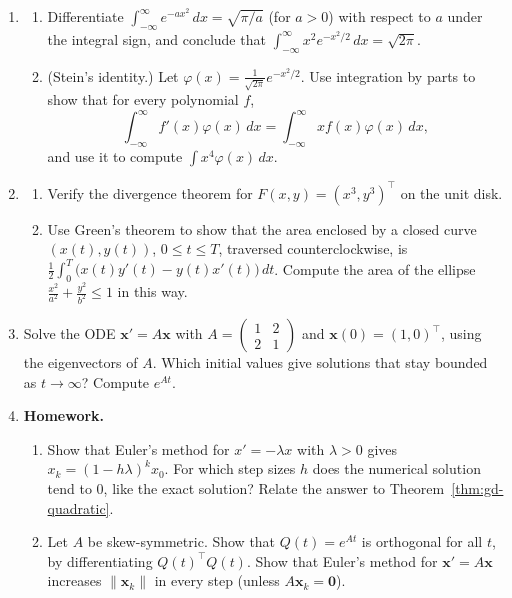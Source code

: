 \documentclass[11pt]{article}
\newcommand{\homework}{\textcolor{red!70!black}{\textbf{Homework.}}}
\newcommand{\norm}[1]{\lVert #1 \rVert}
\theoremstyle{definition}
\theoremstyle{plain}
\theoremstyle{remark}
\begin{document}
\begin{enumerate}[leftmargin=*]
\begin{enumerate}[label=(\alph*)]
    \end{enumerate}
    \item \begin{enumerate}[label=(\alph*)]
        \item Differentiate $\int_{-\infty}^\infty e^{-ax^2}\, dx = \sqrt{\pi/a}$ (for $a > 0$) with respect to $a$ under the integral sign, and conclude that $\int_{-\infty}^\infty x^2e^{-x^2/2}\, dx = \sqrt{2\pi}$.
        \item (Stein's identity.) Let $\varphi(x) = \frac{1}{\sqrt{2\pi}}e^{-x^2/2}$. Use integration by parts to show that for every polynomial $f$,
        \[\int_{-\infty}^\infty f'(x)\varphi(x)\, dx = \int_{-\infty}^\infty xf(x)\varphi(x)\, dx,\]
        and use it to compute $\int x^4\varphi(x)\, dx$.
    \end{enumerate}
    \item \begin{enumerate}[label=(\alph*)]
        \item Verify the divergence theorem for $F(x, y) = (x^3, y^3)^\top$ on the unit disk.
        \item Use Green's theorem to show that the area enclosed by a closed curve $(x(t), y(t))$, $0 \leq t \leq T$, traversed counterclockwise, is $\frac{1}{2}\int_0^T \big(x(t)y'(t) - y(t)x'(t)\big)\, dt$. Compute the area of the ellipse $\frac{x^2}{a^2} + \frac{y^2}{b^2} \leq 1$ in this way.
    \end{enumerate}
    \item Solve the ODE $\mathbf{x}' = A\mathbf{x}$ with $A = \begin{pmatrix} 1 & 2 \\ 2 & 1 \end{pmatrix}$ and $\mathbf{x}(0) = (1, 0)^\top$, using the eigenvectors of $A$. Which initial values give solutions that stay bounded as $t \to \infty$? Compute $e^{At}$.
    \item\label{ex3:euler-skew} \homework{} \begin{enumerate}[label=(\alph*)]
        \item Show that Euler's method for $x' = -\lambda x$ with $\lambda > 0$ gives $x_k = (1 - h\lambda)^k x_0$. For which step sizes $h$ does the numerical solution tend to $0$, like the exact solution? Relate the answer to Theorem~\ref{thm:gd-quadratic}.
        \item Let $A$ be skew-symmetric. Show that $Q(t) = e^{At}$ is orthogonal for all $t$, by differentiating $Q(t)^\top Q(t)$. Show that Euler's method for $\mathbf{x}' = A\mathbf{x}$ increases $\norm{\mathbf{x}_k}$ in every step (unless $A\mathbf{x}_k = \mathbf{0}$).

\end{enumerate}
\end{enumerate}
\end{document}
